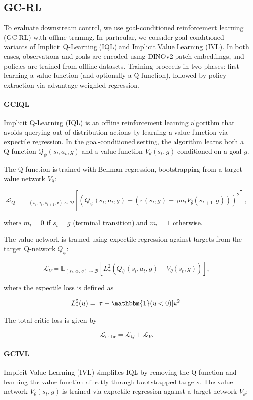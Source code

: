 \subsection{GC-RL}

To evaluate downstream control, we use goal-conditioned reinforcement learning (GC-RL) with offline training. In particular, we consider goal-conditioned variants of Implicit Q-Learning (IQL) and Implicit Value Learning (IVL). In both cases, observations and goals are encoded using DINOv2 patch embeddings, and policies are trained from offline datasets. Training proceeds in two phases: first learning a value function (and optionally a Q-function), followed by policy extraction via advantage-weighted regression.

\paragraph{GCIQL}
Implicit Q-Learning (IQL) \cite{kostrikov2021offline} is an offline reinforcement learning algorithm that avoids querying out-of-distribution actions by learning a value function via expectile regression. In the goal-conditioned setting, the algorithm learns both a Q-function $Q_\psi(s_t, a_t, g)$ and a value function $V_\theta(s_t, g)$ conditioned on a goal $g$.

The Q-function is trained with Bellman regression, bootstrapping from a target value network $V_{\bar{\theta}}$:

\[
\mathcal{L}_{Q} =
\mathbb{E}_{(s_t, a_t, s_{t+1}, g) \sim \mathcal{D}}
\left[
\left(
Q_\psi(s_t, a_t, g) -
\left(
r(s_t, g) + \gamma m_t V_{\bar{\theta}}(s_{t+1}, g)
\right)
\right)^2
\right],
\]

where $m_t = 0$ if $s_t = g$ (terminal transition) and $m_t = 1$ otherwise.

The value network is trained using expectile regression against targets from the target Q-network $Q_{\bar{\psi}}$:

\[
\mathcal{L}_{V} =
\mathbb{E}_{(s_t, a_t, g) \sim \mathcal{D}}
\left[
L_\tau^2
\left(
Q_{\bar{\psi}}(s_t, a_t, g) - V_\theta(s_t, g)
\right)
\right],
\]

where the expectile loss is defined as

\[
L_\tau^2(u) = |\tau - \mathbbm{1}(u < 0)| u^2 .
\]

The total critic loss is given by

\[
\mathcal{L}_{\text{critic}} = \mathcal{L}_Q + \mathcal{L}_V .
\]

\paragraph{GCIVL}
Implicit Value Learning (IVL) \cite{park2025ogbench} simplifies IQL by removing the Q-function and learning the value function directly through bootstrapped targets. The value network $V_\theta(s_t, g)$ is trained via expectile regression against a target network $V_{\bar{\theta}}$:

